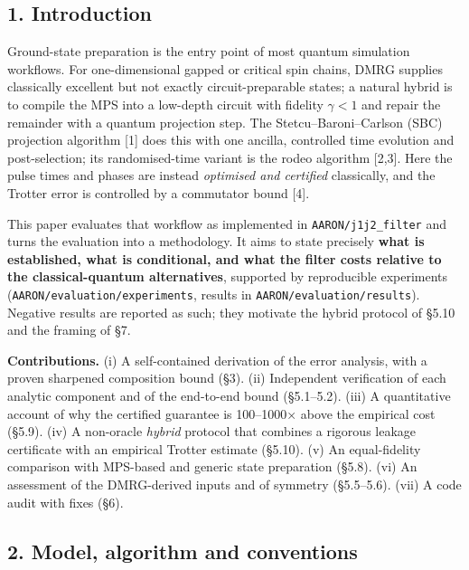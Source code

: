 \documentclass[
]{article}
\begin{document}
\hypertarget{introduction}{%
\subsection{1. Introduction}\label{introduction}}

Ground-state preparation is the entry point of most quantum simulation
workflows. For one-dimensional gapped or critical spin chains, DMRG
supplies classically excellent but not exactly circuit-preparable
states; a natural hybrid is to compile the MPS into a low-depth circuit
with fidelity \(\gamma<1\) and repair the remainder with a quantum
projection step. The Stetcu--Baroni--Carlson (SBC) projection algorithm
{[}1{]} does this with one ancilla, controlled time evolution and
post-selection; its randomised-time variant is the rodeo algorithm
{[}2,3{]}. Here the pulse times and phases are instead \emph{optimised
and certified} classically, and the Trotter error is controlled by a
commutator bound {[}4{]}.

This paper evaluates that workflow as implemented in
\texttt{AARON/j1j2\_filter} and turns the evaluation into a methodology.
It aims to state precisely \textbf{what is established, what is
conditional, and what the filter costs relative to the classical-quantum
alternatives}, supported by reproducible experiments
(\texttt{AARON/evaluation/experiments}, results in
\texttt{AARON/evaluation/results}). Negative results are reported as
such; they motivate the hybrid protocol of §5.10 and the framing of §7.

\textbf{Contributions.} (i) A self-contained derivation of the error
analysis, with a proven sharpened composition bound (§3). (ii)
Independent verification of each analytic component and of the
end-to-end bound (§5.1--5.2). (iii) A quantitative account of why the
certified guarantee is 100--1000× above the empirical cost (§5.9). (iv)
A non-oracle \emph{hybrid} protocol that combines a rigorous leakage
certificate with an empirical Trotter estimate (§5.10). (v) An
equal-fidelity comparison with MPS-based and generic state preparation
(§5.8). (vi) An assessment of the DMRG-derived inputs and of symmetry
(§5.5--5.6). (vii) A code audit with fixes (§6).

\hypertarget{model-algorithm-and-conventions}{%
\subsection{2. Model, algorithm and
conventions}\label{model-algorithm-and-conventions}}
\end{document}
